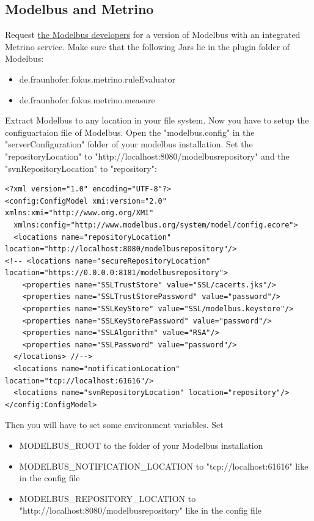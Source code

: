 \subsection{Modelbus and Metrino}
Request \href{http://www.modelbus.org/modelbus/}{the Modelbus developers} for a version of Modelbus with an integrated Metrino service. Make sure that the following Jars lie in the plugin folder of Modelbus:
\begin{itemize}
	\item de.fraunhofer.fokus.metrino.ruleEvaluator
	\item de.fraunhofer.fokus.metrino.measure
\end{itemize}
Extract Modelbus to any location in your file system. Now you have to setup the configuartaion file of Modelbus. Open the "modelbus.config" in the "serverConfiguration" folder of your modelbus installation. Set the "repositoryLocation" to "http://localhost:8080/modelbusrepository" and the "svnRepositoryLocation" to "repository":
\begingroup
    \fontsize{10pt}{12pt}\selectfont
    \begin{verbatim}  
<?xml version="1.0" encoding="UTF-8"?>
<config:ConfigModel xmi:version="2.0" xmlns:xmi="http://www.omg.org/XMI" 
  xmlns:config="http://www.modelbus.org/system/model/config.ecore">
  <locations name="repositoryLocation" location="http://localhost:8080/modelbusrepository"/>
<!-- <locations name="secureRepositoryLocation" location="https://0.0.0.0:8181/modelbusrepository">
    <properties name="SSLTrustStore" value="SSL/cacerts.jks"/>
    <properties name="SSLTrustStorePassword" value="password"/>
    <properties name="SSLKeyStore" value="SSL/modelbus.keystore"/>
    <properties name="SSLKeyStorePassword" value="password"/>
    <properties name="SSLAlgorithm" value="RSA"/>
    <properties name="SSLPassword" value="password"/>
  </locations> //-->
  <locations name="notificationLocation" location="tcp://localhost:61616"/>
  <locations name="svnRepositoryLocation" location="repository"/>
</config:ConfigModel>
    \end{verbatim}  
\endgroup
Then you will have to set some environment variables. Set
\begin{itemize}
	\item MODELBUS\_ROOT to the folder of your Modelbus installation
	\item MODELBUS\_NOTIFICATION\_LOCATION  to "tcp://localhost:61616" like in the config file
	\item MODELBUS\_REPOSITORY\_LOCATION to \\
	"http://localhost:8080/modelbusrepository" like in the config file
\end{itemize}



